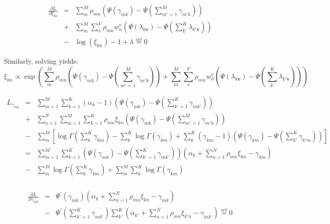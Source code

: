 \documentclass[]{article}
\newcommand{\mbrack}[1]{\left\lbrack #1 \right\rbrack}
\newcommand{\mparen}[1]{\left(#1\right)}
\begin{document}
\begin{eqnarray}
\frac{\partial L}{\partial \xi_{kn}}
&=& \sum\limits_{m}^{M} \rho_{mn} \mparen{\Psi(\gamma_{mk}) - \Psi\mparen{\sum\limits_{m'=1}^{M} \gamma_{m'k}}} \\
&+& \sum\limits_{m}^{M} \sum\limits_{v}^{V} \rho_{mn} w_n^v \mparen{\Psi(\lambda_{k\boldsymbol{v}}) - \Psi\mparen{\sum\limits_{k'}^{K} \lambda_{k'\boldsymbol{v}}}} \\  
&-& \log(\xi_{kn}) - 1 + \lambda \stackrel{set}{=} 0
\end{eqnarray}

Similarly, solving yields:
\[ \boxed{
\xi_{kn} \propto \exp \mparen{\sum\limits_{m}^{M} \rho_{mn} \mparen{\Psi(\gamma_{mk}) - \Psi\mparen{\sum\limits_{m'=1}^{M} \gamma_{m'k}}} + \sum\limits_{m}^{M} \sum\limits_{v}^{V} \rho_{mn} w_n^v \mparen{\Psi(\lambda_{k\boldsymbol{v}}) - \Psi\mparen{\sum\limits_{k'}^{K} \lambda_{k'\boldsymbol{v}}}}}
} \]

\begin{eqnarray}
L_{\gamma_{mk}}
&=& \sum\limits_{m=1}^{M} \sum\limits_{k=1}^{K} (\alpha_{k}-1) \mparen{\Psi(\gamma_{mk}) - \Psi\mparen{\sum\limits_{k'=1}^{K} \gamma_{mk'}}}  \\
&+& \sum\limits_{n=1}^{N} \sum\limits_{m=1}^{M} \sum\limits_{k=1}^{K} \rho_{mn} \xi_{kn} \mparen {\Psi(\gamma_{mk}) - \Psi \mparen{\sum\limits_{m'=1}^{M} \gamma_{m'k}}} \\
&-& \sum\limits_{m}^{M} \mbrack{ \log \Gamma\mparen{ \sum\limits_{k}^{K} \gamma_{km}} - \sum\limits_{k}^{K} \log \Gamma(\gamma_{km}) + \sum\limits_{k}^{K}(\gamma_{km}-1)\mparen{\Psi(\gamma_{km}) - \Psi \mparen{\sum\limits_{k'}^{K} \gamma_{k'm}}}}\\
&=& \sum\limits_{m=1}^{M} \sum\limits_{k=1}^{K} \mparen{\Psi(\gamma_{mk}) - \Psi\mparen{\sum\limits_{k'=1}^{K} \gamma_{mk'}}}  
\mparen{ \alpha_{k} + \sum\limits_{n=1}^{N} \rho_{mn} \xi_{kn} - \gamma_{km} }\\
&-& \sum\limits_{m}^{M} \log \Gamma \mparen{\sum\limits_{k}^{K} \gamma_{km}} + \sum\limits_{m}^{M} \sum\limits_{k}^{K} \log \Gamma(\gamma_{km}) \\
\end{eqnarray}

\begin{eqnarray}
\frac{\partial L}{\partial \gamma_{mk}}
&=& \Psi^\prime(\gamma_{mk}) (\alpha_{k} + \sum\limits_{n=1}^{N} \rho_{mn} \xi_{kn} - \gamma_{mk})  \\
&-& \Psi^\prime\mparen{\sum\limits_{k'=1}^{K} \gamma_{mk'}} \sum\limits_{k'}^{K} (\alpha_{k'} + \sum\limits_{n=1}^{N} \rho_{mn} \xi_{k'n} - \gamma_{mk'}) \stackrel{set}{=} 0
\end{eqnarray}
\end{document}
